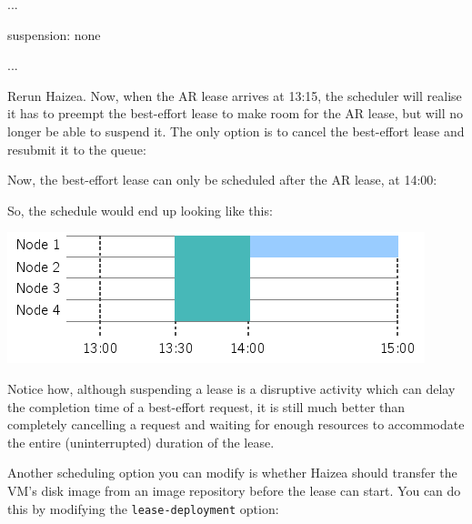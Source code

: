 \begin{wideshellverbatim}
[scheduling]
...

suspension: none

...
\end{wideshellverbatim}

Rerun Haizea. Now, when the AR lease arrives at 13:15, the scheduler will realise it has to preempt the best-effort lease to make room for the AR lease, but will no longer be able to suspend it. The only option is to cancel the best-effort lease and resubmit it to the queue:


Now, the best-effort lease can only be scheduled after the AR lease, at 14:00:


So, the schedule would end up looking like this:

\begin{center}
\includegraphics{images/quickstart_leasegraph4.png}
\end{center}

Notice how, although suspending a lease is a disruptive activity which can delay the completion time of a best-effort request, it is still much better than completely cancelling a request and waiting for enough resources to accommodate the entire (uninterrupted) duration of the lease.

Another scheduling option you can modify is whether Haizea should transfer the VM's disk image from an image repository before the lease can start. You can do this by modifying the \texttt{lease-deployment} option:

